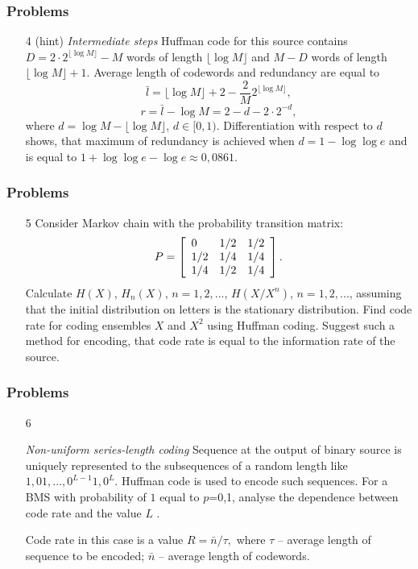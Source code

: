 \documentclass[14pt]{beamer}
\begin{document}
\begin{frame}
\frametitle{Problems}
\begin{enumerate}
   
  \item[4 (hint)] 
  \small{ \emph{Intermediate steps} Huffman code for this source contains $D=2\cdot 2^{\lfloor \log M \rfloor} - M$ words of length 
$\lfloor \log M \rfloor$ and  $M-D$ words of length $\lfloor \log M
\rfloor+1$. Average length of codewords and redundancy are equal to 
\[
\bar l =\lfloor \log M \rfloor+2-\frac{2}{M}%
2^{\lfloor \log M \rfloor},
\]
\[
r=\bar l - \log M= 2-d-2\cdot 2^{-d},
\]
where $d=\log M - \lfloor \log M \rfloor$, $d\in[0,1)$.
Differentiation with respect to $d$ shows, that maximum of redundancy is achieved when $d=1-\log\log e$ and is equal to $1+\log\log e - \log e
\approx 0,0861$.
  }
\end{enumerate}
\end{frame}


\begin{frame}
\frametitle{Problems}
\begin{enumerate}
  
  \item[5] 
  \small{ Consider Markov chain with the probability transition matrix:
\[
P = \left[ {{\begin{array}{*{20}c}
 0 \hfill & {1 / 2} \hfill & {1 / 2} \hfill \\
 {1 / 2} \hfill & {1 / 4} \hfill & {1 / 4} \hfill \\
 {1 / 4} \hfill & {1 / 2} \hfill & {1 / 4} \hfill \\
\end{array} }} \right].
\]
  Calculate $H\left( X \right)$, $H_n \left( X \right)$,  $n = 1,2,...$, $H\left( {X / X^n} \right)$, $n = 1,2,...$, assuming that the initial distribution on letters is the stationary distribution.
  Find code rate for coding ensembles $X$ and $X^2$ using Huffman coding. Suggest such a method for encoding, that code rate is equal to the information rate of the source. 
  }
\end{enumerate}
\end{frame}


\begin{frame}
\frametitle{Problems}
\begin{enumerate}
  \item[6] \small{  \emph{Non-uniform series-length coding} 
  Sequence at the output of binary source is uniquely represented to the subsequences of a random length like  $1,01,...,0^{L - 1}1,0^L$. 
  Huffman code is used to encode such sequences.
  For a BMS with probability of $1$ equal to $p$=0,1, analyse the dependence between code rate and the value $L$ . 
  
  Code rate in this case is a value $R = \bar{n} / \tau ,$ where \textit{$\tau $} -- average length of sequence to be encoded; $\bar {n}$ -- average length of codewords.
}
\end{enumerate}
\end{frame}
\end{document}
